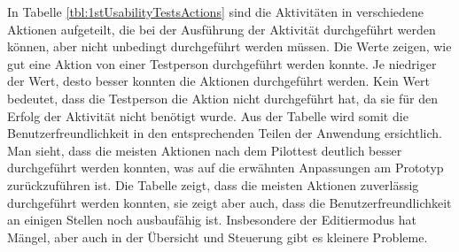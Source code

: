 In Tabelle \ref{tbl:1stUsabilityTestsActions} sind die Aktivitäten in verschiedene Aktionen aufgeteilt, die bei der Ausführung der Aktivität durchgeführt werden können, aber nicht unbedingt durchgeführt werden müssen. Die Werte zeigen, wie gut eine Aktion von einer Testperson durchgeführt werden konnte. Je niedriger der Wert, desto besser konnten die Aktionen durchgeführt werden. Kein Wert bedeutet, dass die Testperson die Aktion nicht durchgeführt hat, da sie für den Erfolg der Aktivität nicht benötigt wurde. Aus der Tabelle wird somit die Benutzerfreundlichkeit in den entsprechenden Teilen der Anwendung ersichtlich. Man sieht, dass die meisten Aktionen nach dem Pilottest deutlich besser durchgeführt werden konnten, was auf die erwähnten Anpassungen am Prototyp zurückzuführen ist. Die Tabelle zeigt, dass die meisten Aktionen zuverlässig durchgeführt werden konnten, sie zeigt aber auch, dass die Benutzerfreundlichkeit an einigen Stellen noch ausbaufähig ist. Insbesondere der Editiermodus hat Mängel, aber auch in der Übersicht und Steuerung gibt es kleinere Probleme.


